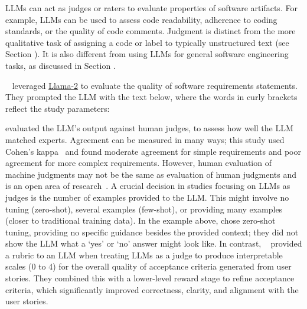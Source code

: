 \label{sec:llms-as-judges}


LLMs can act as judges or raters to evaluate properties of software artifacts.
For example, LLMs can be used to assess code readability, adherence to coding standards, or the quality of code comments.
Judgment is distinct from the more qualitative task of assigning a code or label to typically unstructured text (see Section \annotators).
It is also different from using LLMs for general software engineering tasks, as discussed in Section \llmsforresearcher.


\citeauthor{DBLP:conf/re/LubosFTGMEL24}~\cite{DBLP:conf/re/LubosFTGMEL24} leveraged \href{https://www.llama.com/llama2/}{Llama-2} to evaluate the quality of software requirements statements. 
They prompted the LLM with the text below, where the words in curly brackets reflect the study parameters:

\judgesexample

\citeauthor{DBLP:conf/re/LubosFTGMEL24} evaluated the LLM's output against human judges, to assess how well the LLM matched experts. 
Agreement can be measured in many ways; this study used Cohen's kappa~\cite{cohen60} and found moderate agreement for simple requirements and poor agreement for more complex requirements.
However, human evaluation of machine judgments may not be the same as evaluation of human judgments and is an open area of research~\cite{DBLP:journals/corr/abs-2410-03775}. 
A crucial decision in studies focusing on LLMs as judges is the number of examples provided to the LLM.
This might involve no tuning (zero-shot), several examples (few-shot), or providing many examples (closer to traditional training data).
In the example above, \citeauthor{DBLP:conf/re/LubosFTGMEL24} chose zero-shot tuning, providing no specific guidance besides the provided context; they did not show the LLM what a `yes' or `no' answer might look like. 
In contrast, \citeauthor{wang2025multimodalrequirementsdatabasedacceptance}~\cite{wang2025multimodalrequirementsdatabasedacceptance} provided a rubric to an LLM when treating LLMs as a judge to produce interpretable scales (0 to 4) for the overall quality of acceptance criteria generated from user stories.
They combined this with a lower-level reward stage to refine acceptance criteria, which significantly improved correctness, clarity, and alignment with the user stories.

